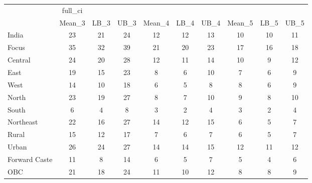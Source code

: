 \begin{tabular}{l*{9}{c}}
\toprule
                    &     full\_ci&            &            &            &            &            &            &            &            \\
                    &      Mean\_3&        LB\_3&        UB\_3&      Mean\_4&        LB\_4&        UB\_4&      Mean\_5&        LB\_5&        UB\_5\\
\midrule
India               &          23&          21&          24&          12&          12&          13&          10&          10&          11\\
Focus               &          35&          32&          39&          21&          20&          23&          17&          16&          18\\
Central             &          24&          20&          28&          12&          11&          14&          10&           9&          12\\
East                &          19&          15&          23&           8&           6&          10&           7&           6&           9\\
West                &          14&          10&          18&           6&           5&           8&           8&           6&           9\\
North               &          23&          19&          27&           8&           7&          10&           9&           8&          10\\
South               &           6&           4&           8&           3&           2&           4&           3&           2&           4\\
Northeast           &          22&          16&          27&          14&          12&          15&           6&           5&           7\\
Rural               &          15&          12&          17&           7&           6&           7&           6&           5&           7\\
Urban               &          26&          24&          27&          14&          14&          15&          12&          11&          12\\
Forward Caste       &          11&           8&          14&           6&           5&           7&           5&           4&           6\\
OBC                 &          21&          18&          24&          11&          10&          12&           8&           8&           9\\

\end{tabular}
